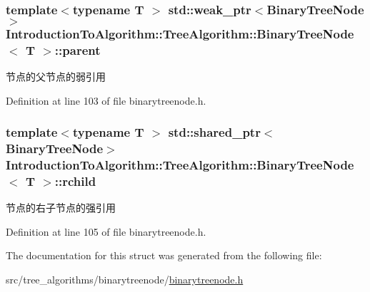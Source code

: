\subsubsection[{parent}]{\setlength{\rightskip}{0pt plus 5cm}template$<$typename T $>$ std\+::weak\+\_\+ptr$<${\bf Binary\+Tree\+Node}$>$ {\bf Introduction\+To\+Algorithm\+::\+Tree\+Algorithm\+::\+Binary\+Tree\+Node}$<$ T $>$\+::parent}\label{struct_introduction_to_algorithm_1_1_tree_algorithm_1_1_binary_tree_node_ab0f7e754f706b71943e8453c66485fd4}
节点的父节点的弱引用 

Definition at line 103 of file binarytreenode.\+h.

\hypertarget{struct_introduction_to_algorithm_1_1_tree_algorithm_1_1_binary_tree_node_a5b0994f31d2ca698326aed39bd6ced65}{}
\subsubsection[{rchild}]{\setlength{\rightskip}{0pt plus 5cm}template$<$typename T $>$ std\+::shared\+\_\+ptr$<${\bf Binary\+Tree\+Node}$>$ {\bf Introduction\+To\+Algorithm\+::\+Tree\+Algorithm\+::\+Binary\+Tree\+Node}$<$ T $>$\+::rchild}\label{struct_introduction_to_algorithm_1_1_tree_algorithm_1_1_binary_tree_node_a5b0994f31d2ca698326aed39bd6ced65}
节点的右子节点的强引用 

Definition at line 105 of file binarytreenode.\+h.



The documentation for this struct was generated from the following file\+:\begin{DoxyCompactItemize}
\item 
src/tree\+\_\+algorithms/binarytreenode/\hyperlink{binarytreenode_8h}{binarytreenode.\+h}\end{DoxyCompactItemize}
